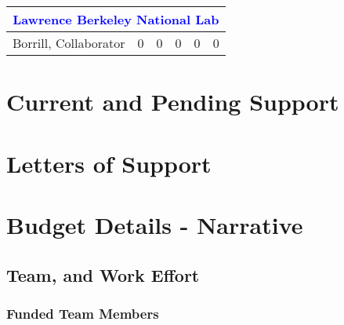 \documentclass[12pt]{article}
\begin{document}
\begin{table}[h]
\begin{center}
\begin{tabular}{|c|c|c|c|c|c|}
\multicolumn{6}{|c|}{\textcolor{blue}{Lawrence Berkeley National Lab} }  \\ \hline
Borrill, Collaborator   &  0  &  0  & 0 & 0 & 0  \\ \hline
\end{tabular}
\end{center}
\vspace{-0.1in}
\end{table}

\newpage

\section{Current and Pending Support}
\label{sec:current_and_pending}

\newpage
\addtocounter{page}{13}
\section{Letters of Support}
\label{sec:lettersofsupport}

\newpage
\addtocounter{page}{3}
\section{Budget Details - Narrative}
\label{sec:budget}

\subsection{Team, and Work Effort}
\label{sec:budget_principles}


\subsubsection{Funded Team Members}

\end{document}
